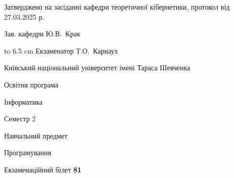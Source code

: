 \documentclass[12pt, ukrainian]{article}
\begin{document}
{\smallskip\smallskip \begin {scriptsize} Затверджено на засіданні кафедри теоретичної кібернетики, протокол   від   27.03.2025 р.\par\smallskip\smallskip\smallskip\smallskip
{\parbox {6.5 cm} {Зав. кафедри \dotfill Ю.В.~Крак}}\hspace {0.7cm} {\hbox to 6.5 cm { Екзаменатор \dotfill Т.О.~Карнаух}} \end{scriptsize}}
\newpage
{{\begin {scriptsize}\par
{ \center  Київський національний університет імені Тараса Шевченка \par}
{\parbox {5 cm}{Освітня програма \hfill}{\parbox {7 cm}{Інформатика\hfill}}\parbox {6 cm}{\hfill Семестр 2}}\par
{\parbox {5 cm} {Навчальний предмет \hfill}\parbox {7 cm}{Програмування \hfill}\parbox {6cm}{\hfill}\par}\vspace{-15pt} \end{scriptsize}}{\center Екзаменаційний білет \No \textbf { 81 }\par}}
\end{document}
